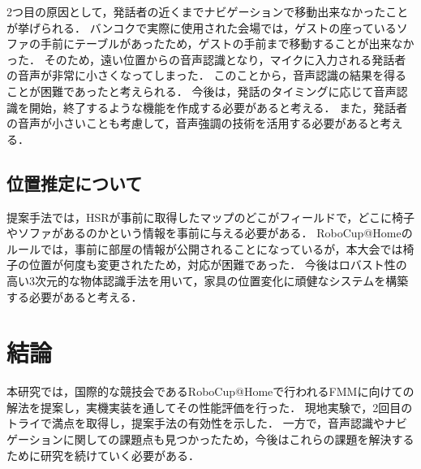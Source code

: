 \documentclass[a4j]{jarticle}
\begin{document}
2つ目の原因として，発話者の近くまでナビゲーションで移動出来なかったことが挙げられる．
バンコクで実際に使用された会場では，ゲストの座っているソファの手前にテーブルがあったため，ゲストの手前まで移動することが出来なかった．
そのため，遠い位置からの音声認識となり，マイクに入力される発話者の音声が非常に小さくなってしまった．
このことから，音声認識の結果を得ることが困難であったと考えられる．
今後は，発話のタイミングに応じて音声認識を開始，終了するような機能を作成する必要があると考える．
また，発話者の音声が小さいことも考慮して，音声強調\cite{voice_enhancement_1, voice_enhancement_2}の技術を活用する必要があると考える．

\subsection{位置推定について}
提案手法では，HSRが事前に取得したマップのどこがフィールドで，どこに椅子やソファがあるのかという情報を事前に与える必要がある．
RoboCup@Homeのルールでは，事前に部屋の情報が公開されることになっているが，本大会では椅子の位置が何度も変更されたため，対応が困難であった．
今後はロバスト性の高い3次元的な物体認識手法\cite{omni3d, sun2022onepose}を用いて，家具の位置変化に頑健なシステムを構築する必要があると考える．


\section{結論}
本研究では，国際的な競技会であるRoboCup@Homeで行われるFMMに向けての解法を提案し，実機実装を通してその性能評価を行った．
現地実験で，2回目のトライで満点を取得し，提案手法の有効性を示した．
一方で，音声認識やナビゲーションに関しての課題点も見つかったため，今後はこれらの課題を解決するために研究を続けていく必要がある．
\end{document}
